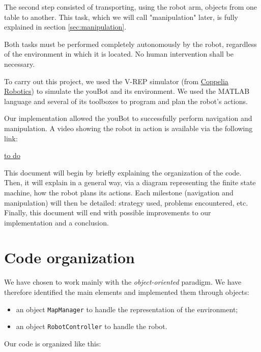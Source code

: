 \documentclass[a4paper, 10pt, conference]{ieeeconf}
\begin{document}
    The second step consisted of transporting, using the robot arm, objects from one table to another. This task, which we will call "manipulation" later, is fully explained in section \ref{sec:manipulation}.
    
    Both tasks must be performed completely autonomously by the robot, regardless of the environment in which it is located. No human intervention shall be necessary.
    
    To carry out this project, we used the V-REP simulator (from \href{https://www.coppeliarobotics.com}{Coppelia Robotics}) to simulate the youBot and its environment. We used the MATLAB language and several of its toolboxes to program and plan the robot's actions.
    
    Our implementation allowed the youBot to successfully perform navigation and manipulation. A video showing the robot in action is available via the following link:
    
    \begin{center}
        \href{to do}{to do}
    \end{center}
    
    This document will begin by briefly explaining the organization of the code. Then, it will explain in a general way, via a diagram representing the finite state machine, how the robot plans its actions. Each milestone (navigation and manipulation) will then be detailed: strategy used, problems encountered, etc. Finally, this document will end with possible improvements to our implementation and a conclusion.
    
    
    \section{Code organization}
    
    We have chosen to work mainly with the \emph{object-oriented} paradigm. We have therefore identified the main elements and implemented them through objects:
    
    \begin{itemize}
        \item an object \texttt{MapManager} to handle the representation of the environment;
        \item an object \texttt{RobotController} to handle the robot.
    \end{itemize}
    
    Our code is organized like this:
    
\end{document}
